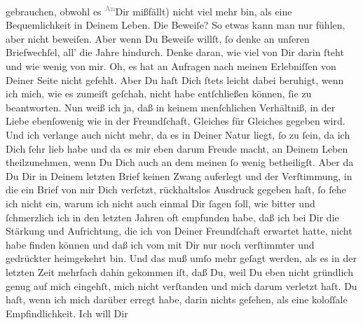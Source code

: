 \begin{ledgroupsized}[t]{13cm}
               gebrauchen,  obwohl es \substVorne{}\textsuperscript{\textcolor{gray}{An}}\substDazwischen{}Dir\substHinten{} mißfällt) nicht viel mehr bin, als eine Bequemlichkeit in Deinem Leben. Die
               Beweiſe? So etwas kann man nur fühlen, aber nicht beweiſen. Aber wenn Du Beweiſe
               willſt, ſo denke an unſeren Briefwechſel, all’ die Jahre hindurch. Denke {\pb}daran, wie viel von Dir darin ſteht und wie wenig
               von mir. Oh, es hat an Anfragen nach meinen Erlebniſſen von Deiner Seite nicht
               gefehlt. Aber Du haſt Dich ſtets leicht dabei beruhigt, wenn ich mich, wie es zumeiſt
               geſchah, nicht habe entſchließen können, ſie zu beantworten. Nun weiß ich ja, daß in
               keinem menſchlichen Verhältniß, in der Liebe ebenſowenig wie in der Freundſchaft,
               Gleiches für Gleiches gegeben wird. Und ich verlange auch nicht mehr, da es in Deiner
               Natur liegt, ſo zu ſein, da ich Dich ſehr lieb habe und da es mir eben darum Freude
               macht, an Deinem Leben theilzunehmen, wenn Du Dich auch an dem meinen ſo wenig
               betheiligſt. Aber da Du Dir in Deinem letzten Brief keinen Zwang auferlegt und der
               Verſtimmung, in die ein Brief von mir Dich verſetzt, rückhaltslos Ausdruck gegeben
               haſt, ſo ſehe ich nicht ein, warum ich nicht auch einmal Dir ſagen ſoll, wie bitter
               und ſchmerzlich \strikeout{\textcolor{gray}{h}} ich in den letzten Jahren oft  empfunden
               habe, daß {\pb}ich bei Dir die Stärkung und Aufrichtung,
               die ich von Deiner Freundſchaft erwartet hatte, nicht habe finden können und daß ich
               vom \label{K_L03194-2v}\label{K_L03194-2h} mit Dir nur noch
               verſtimmter und gedrückter heimgekehrt bin. Und das muß umſo mehr geſagt werden, als
               es in der letzten Zeit mehrfach dahin gekommen iſt, daß Du, weil Du eben nicht
               gründlich genug auf mich eingehſt, mich \strikeout{\textcolor{gray}{×}\-\textcolor{gray}{×}} nicht verſtanden und mich darum verletzt haſt. Du haſt, wenn ich mich darüber
               erregt habe, darin nichts geſehen, als eine koloſſale Empfindlichkeit. Ich will Dir

\end{ledgroupsized}

